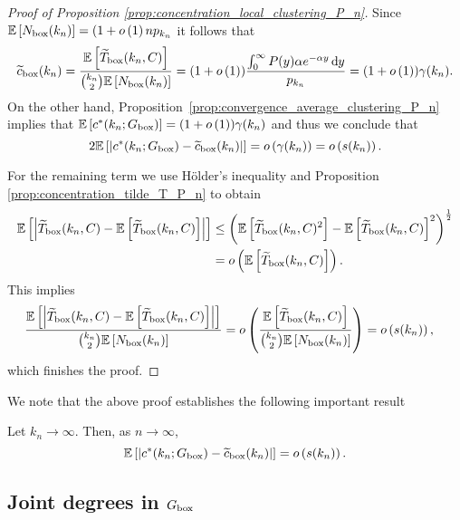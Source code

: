 \begin{proof}[Proof of Proposition \ref{prop:concentration_local_clustering_P_n}]
Since $\mathbb{E}\left[N_{\text{box}}(k_n)\right] = (1+o\left(1\right)n p_{k_n}$ it follows that
\[
	\widetilde{c}_{\text{box}}(k_n) = \frac{\mathbb{E}\left[\widetilde{T}_{\text{box}}(k_n,C)\right]}{\binom{k_n}{2}\mathbb{E}\left[N_{\text{box}}(k_n)\right]}
	= (1+o\left(1\right)) \frac{\int_0^\infty P(y) \alpha e^{-\alpha y} \operatorname{\mathrm{d}\hspace{-2pt}} y}{p_{k_n}}
	= (1 + o\left(1\right)) \gamma(k_n).
\]
On the other hand, Proposition~\ref{prop:convergence_average_clustering_P_n} implies that $\mathbb{E}\left[c^\ast(k_n; G_{\mathrm{box}})\right] = (1+o\left(1\right))\gamma(k_n)$ and thus we conclude that
\[
	2\mathbb{E}\left[\left|c^\ast(k_n; G_{\mathrm{box}}) - \widetilde{c}_{\text{box}}(k_n)\right|\right]
	= o\left(\gamma(k_n)\right) = o\left(s(k_n)\right).	
\]

For the remaining term we use H\"{o}lder's inequality and Proposition \ref{prop:concentration_tilde_T_P_n} to obtain
\begin{align*}
	\mathbb{E}\left[\left|\widetilde{T}_{\text{box}}(k_n,C) - \mathbb{E}\left[\widetilde{T}_{\text{box}}(k_n,C)\right]\right|\right]
	&\le \left(\mathbb{E}\left[\widetilde{T}_{\text{box}}(k_n,C)^2\right] 
		- \mathbb{E}\left[\widetilde{T}_{\text{box}}(k_n,C)\right]^2\right)^{\frac{1}{2}}\\
	&= o\left(\mathbb{E}\left[\widetilde{T}_{\text{box}}(k_n,C)\right]\right).
\end{align*}
This implies
\begin{align*}
	\frac{\mathbb{E}\left[\left|\widetilde{T}_{\text{box}}(k_n,C) - \mathbb{E}\left[\widetilde{T}_{\text{box}}(k_n,C)\right]\right|\right]}
		{\binom{k_n}{2}\mathbb{E}\left[N_{\text{box}}(k_n)\right]}
	&= o\left(\frac{\mathbb{E}\left[\widetilde{T}_{\text{box}}(k_n,C)\right]}{\binom{k_n}{2}\mathbb{E}\left[N_{\text{box}}(k_n)\right]}\right)
	= o\left(s(k_n)\right),
\end{align*}
which finishes the proof.
\end{proof}

We note that the above proof establishes the following important result

\begin{corollary}\label{cor:c_ast_box_2_tilde_c_box}
Let $k_n \to \infty$. Then, as $n \to \infty$,
\[
	\mathbb{E}\left[\left|c^\ast(k_n; G_{\mathrm{box}}) - \widetilde{c}_{\mathrm{box}}(k_n)\right|\right] = o\left(s(k_n)\right).
\]
\end{corollary}

\subsection{Joint degrees in $G_{\mathrm{box}}$}


